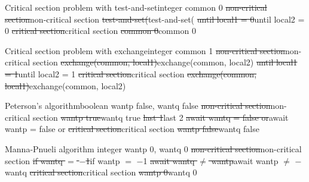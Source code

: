 \begin{wideslide}[bm=,toc=]{\large }
\begin{alg}{Critical section problem with test-and-set}{integer common \la{} 0}\hline
{}
\st{\idt{}non-critical section}{\idt{}non-critical section}
\st{\idt{}\idt{}test-and-set(}{\idt{}\idt{}test-and-set(}
\st{\idt{}until local1 = 0}{\idt{}until local2 = 0}
\st{\idt{}critical section}{\idt{}critical section}
\st{\idt{}common \la{} 0}{\idt{}common \la{} 0}
\end{alg}
\end{wideslide}

\begin{wideslide}[bm=,toc=]{\large }
\begin{alg}{Critical section problem with exchange}{integer common \la{} 1}\hline
{}
\st{\idt{}non-critical section}{\idt{}non-critical section}
\st{\idt{}\idt{}exchange(common, local1)}{\idt{}\idt{}exchange(common, local2)}
\st{\idt{}until local1 = 1}{\idt{}until local2 = 1}
\st{\idt{}critical section}{\idt{}critical section}
\st{\idt{}exchange(common, local1)}{\idt{}exchange(common, local2)}
\end{alg}
\end{wideslide}

\begin{wideslide}[bm=,toc=]{\large }
\begin{alg}{Peterson's algorithm}{boolean wantp \la{} false, wantq \la{} false}
\hline
{}
\st{\idt{}non-critical section}{\idt{}non-critical section}
\st{\idt{}wantp \la{} true}{\idt{}wantq \la{} true}
\st{\idt{}last \la{} 1}{\idt{}last \la{} 2}
\st{\idt{}await wantq = false or}{\idt{}await wantp = false or}
\st{\idt{}critical section}{\idt{}critical section}
\st{\idt{}wantp \la{} false}{\idt{}wantq \la{} false}
\end{alg}
\end{wideslide}

\begin{wideslide}[bm=,toc=]{\large }
\begin{alg}{Manna-Pnueli algorithm}%
{integer wantp \la{} 0, wantq \la{} 0}\hline
{}
\st{\idt{}non-critical section}{\idt{}non-critical section}
\st{\idt{}if wantq $=$ $-$1}{\idt{}if wantp $=$ $-$1}
\st{\idt{}await wantq $\neq$ wantp}{\idt{}await wantp $\neq$ $-$ wantq}
\st{\idt{}critical section}{\idt{}critical section}
\st{\idt{}wantp \la{} 0}{\idt{}wantq \la{} 0}
\end{alg}
\end{wideslide}

